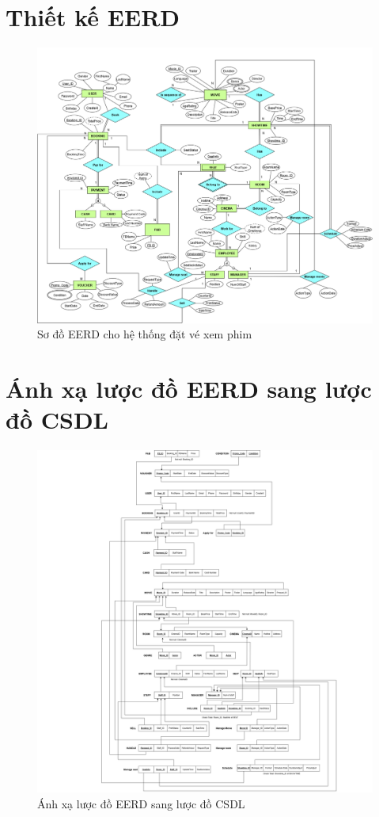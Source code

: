 \documentclass[a4paper]{article}
\begin{document}
\section{Thiết kế EERD}
\begin{figure}[H]
	\includegraphics[width=1.2\textwidth]{Images/EERD.png}
	\caption{Sơ đồ EERD cho hệ thống đặt vé xem phim}
\end{figure}
\pagebreak
\section{Ánh xạ lược đồ EERD sang lược đồ CSDL}
\begin{figure}[H]
	\includegraphics[width=1.2\textwidth]{Images/mapping.png}
	\caption{Ánh xạ lược đồ EERD sang lược đồ CSDL}
\end{figure}
\end{document}
